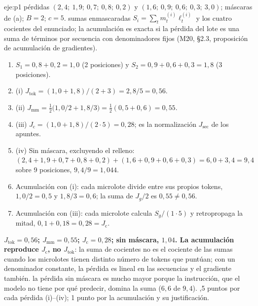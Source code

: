 \begin{solucion}{eje:p1}
\datos pérdidas $(2{,}4;\ 1{,}9;\ 0{,}7;\ 0{,}8;\ 0{,}2)$ y $(1{,}6;\ 0{,}9;\ 0{,}6;\ 0{,}3;\ 3{,}0)$; máscaras de (a); $B=2$; $c=5$.
\planteamiento sumas enmascaradas $S_i=\sum_tm^{(i)}_t\ell^{(i)}_t$ y los cuatro cocientes del enunciado; la acumulación es exacta si la pérdida del lote es una suma de términos por secuencia con denominadores fijos (M20, §2.3, proposición de acumulación de gradientes).
\pasos
\begin{enumerate}[label=\arabic*.]
  \item $S_1=0{,}8+0{,}2=1{,}0$ (2 posiciones) y $S_2=0{,}9+0{,}6+0{,}3=1{,}8$ (3 posiciones).
  \item (i) $J_{\mathrm{tok}}=(1{,}0+1{,}8)/(2+3)=2{,}8/5=0{,}56$.
  \item (ii) $J_{\mathrm{mm}}=\frac12\bigl(1{,}0/2+1{,}8/3\bigr)=\frac12(0{,}5+0{,}6)=0{,}55$.
  \item (iii) $J_{\mathrm{c}}=(1{,}0+1{,}8)/(2\cdot 5)=0{,}28$; es la normalización $J_{\mathrm{sec}}$ de los apuntes.
  \item (iv) Sin máscara, excluyendo el relleno: $(2{,}4+1{,}9+0{,}7+0{,}8+0{,}2)+(1{,}6+0{,}9+0{,}6+0{,}3)=6{,}0+3{,}4=9{,}4$ sobre 9 posiciones, $9{,}4/9=1{,}044$.
  \item Acumulación con (i): cada microlote divide entre sus propios tokens, $1{,}0/2=0{,}5$ y $1{,}8/3=0{,}6$; la suma de $J_g/2$ es $0{,}55\neq 0{,}56$.
  \item Acumulación con (iii): cada microlote calcula $S_g/(1\cdot 5)$ y retropropaga la mitad, $0{,}1+0{,}18=0{,}28=J_{\mathrm{c}}$.
\end{enumerate}
\resultado \textbf{$J_{\mathrm{tok}}=0{,}56$; $J_{\mathrm{mm}}=0{,}55$; $J_{\mathrm{c}}=0{,}28$; sin máscara, $1{,}04$. La acumulación reproduce $J_{\mathrm{c}}$, no $J_{\mathrm{tok}}$}: la suma de cocientes no es el cociente de las sumas cuando los microlotes tienen distinto número de tokens que puntúan; con un denominador constante, la pérdida es lineal en las secuencias y el gradiente también.
\comprobacion la pérdida sin máscara es mucho mayor porque la instrucción, que el modelo no tiene por qué predecir, domina la suma ($6{,}6$ de $9{,}4$).
,5 puntos por cada pérdida (i)--(iv); 1 punto por la acumulación y su justificación.


\end{solucion}
